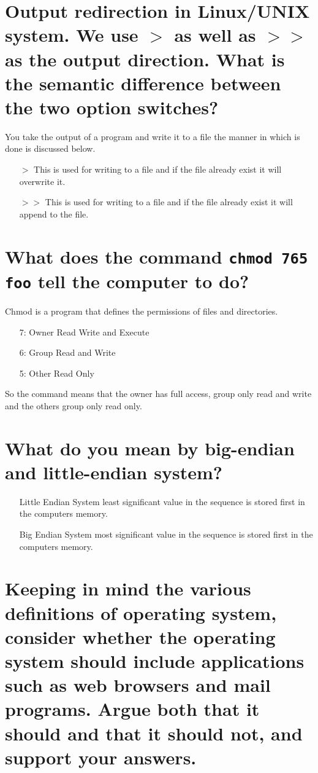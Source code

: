 \documentclass{article}
\begin{document}
\section{Output redirection in Linux/UNIX system. We use \(>\) as well as \(>>\) as the output direction. What is the semantic difference between the two option switches?}
You take the output of a program and write it to a file the manner in which is done is discussed below.
\begin{itemize}
	\item [\(>\)] This is used for writing to a file and if the file already exist it will overwrite it.
	\item [\(>>\)] This is used for writing to a file and if the file already exist it will append to the file.
\end{itemize}
\section{What does the command \texttt{chmod 765 foo} tell the computer to do?}
Chmod is a program that defines the permissions of files and directories. 
\begin{itemize}
	\item [7: Owner] Read Write and Execute
	\item [6: Group] Read and Write
	\item [5: Other] Read Only
\end{itemize}
So the command means that the owner has full access, group only read and write and the others group only read only.
\section{What do you mean by big-endian and little-endian system?}
\begin{itemize}
	\item [Little Endian System] least significant value in the sequence is stored first in the computers memory.
	\item [Big Endian System] most significant value in the sequence is stored first in the computers memory.
\end{itemize}
\section{Keeping in mind the various definitions of \textbf{operating system}, consider whether the operating system should include applications such as web browsers and mail programs. Argue both that it should and that it should not, and support your answers.}
\end{document}
